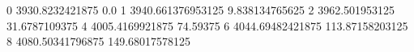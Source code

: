 0 3930.8232421875 0.0
1 3940.661376953125 9.838134765625
2 3962.501953125 31.6787109375
4 4005.4169921875 74.59375
6 4044.69482421875 113.87158203125
8 4080.50341796875 149.68017578125

